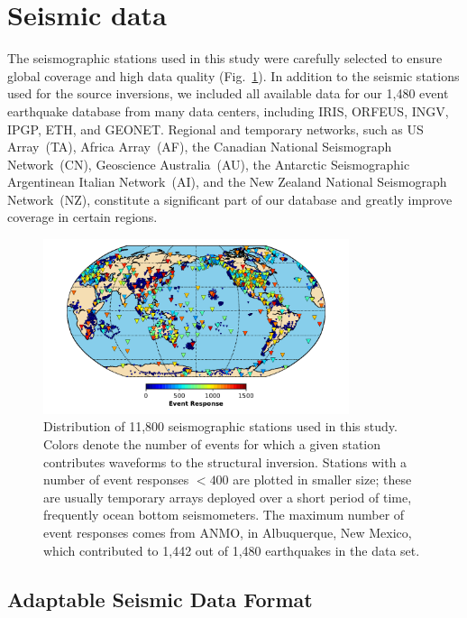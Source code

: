 \documentclass[extra,mreferee]{gji}
\begin{document}
\section{Seismic data}
\label{section:data}

The seismographic stations used in this study were carefully selected to ensure global coverage and high data quality (Fig.~\ref{fig:stations}).
In addition to the seismic stations used for the source inversions,
we included all available data for our 1,480 event earthquake database from many data centers,
including IRIS, ORFEUS, INGV, IPGP, ETH, and GEONET.
Regional and temporary networks,
such as US Array~(TA),
Africa Array~(AF), the Canadian National Seismograph Network~(CN), Geoscience Australia~(AU),
the Antarctic Seismographic Argentinean Italian Network~(AI),
and the New Zealand National Seismograph Network~(NZ),
constitute a significant part
of our database and greatly improve coverage in certain regions.

\begin{figure}
  \includegraphics[width=0.8\textwidth]{figures/station_map.pdf}
  \caption{Distribution of 11,800 seismographic stations used in this study. Colors denote the number of events for which a given station contributes waveforms to the structural inversion. Stations with a number of event responses $<400$ are plotted in smaller size; these are usually temporary arrays deployed over a short period of time, frequently ocean bottom seismometers. The maximum number of event responses comes from ANMO, in Albuquerque, New Mexico, which contributed to 1,442 out of 1,480 earthquakes in the data set.}
  \label{fig:stations}
  \centering
\end{figure}

\subsection{Adaptable Seismic Data Format}
\label{section:ASDF}
\end{document}

